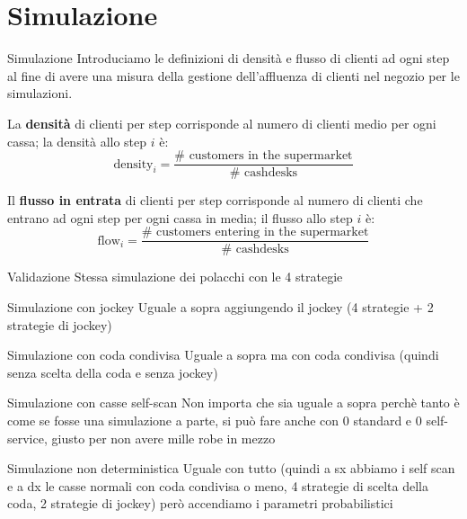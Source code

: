 \section{Simulazione}
\begin{frame}{Simulazione}
	Introduciamo le definizioni di densità e flusso di clienti ad ogni step al fine di avere una misura della gestione dell'affluenza di clienti nel negozio per le simulazioni.
	
	La \textbf{densità} di clienti per step corrisponde al numero di clienti medio per ogni cassa; la densità allo step $i$ è:
	\[\text{density}_i = \frac{\# \text{ customers in the supermarket}}{\# \text{ cashdesks}}\]
	
	Il \textbf{flusso in entrata} di clienti per step corrisponde al numero di clienti che entrano ad ogni step per ogni cassa in media; il flusso allo step $i$ è:
	\[\text{flow}_i = \frac{\# \text{ customers entering in the supermarket}}{\# \text{ cashdesks}}\]
\end{frame}

\begin{frame}{Validazione}
	\centering
	Stessa simulazione dei polacchi con le 4 strategie
\end{frame}

\begin{frame}{Simulazione con jockey}
	\centering
	Uguale a sopra aggiungendo il jockey (4 strategie + 2 strategie di jockey)
\end{frame}

\begin{frame}{Simulazione con coda condivisa}
	\centering
	Uguale a sopra ma con coda condivisa (quindi senza scelta della coda e senza jockey)
\end{frame}

\begin{frame}{Simulazione con casse self-scan}
	\centering
	Non importa che sia uguale a sopra perchè tanto è come se fosse una simulazione a parte, si può fare anche con 0 standard e 0 self-service, giusto per non avere mille robe in mezzo
\end{frame}

\begin{frame}{Simulazione non deterministica}
	\centering
	Uguale con tutto (quindi a sx abbiamo i self scan e a dx le casse normali con coda condivisa o meno, 4 strategie di scelta della coda, 2 strategie di jockey) però accendiamo i parametri probabilistici 
\end{frame}